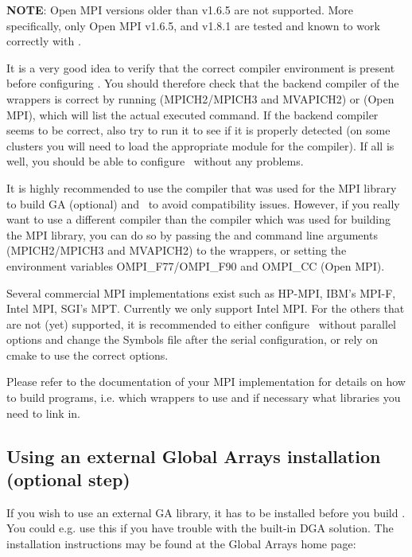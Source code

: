 \textbf{NOTE}: Open MPI versions older than v1.6.5 are not supported. More specifically,
only Open MPI v1.6.5, and v1.8.1 are tested and known to work correctly with \molcas.

It is a very good idea to verify that the correct compiler environment is
present before configuring \molcas.  You should therefore check that the
backend compiler of the wrappers is correct by running  (MPICH2/MPICH3 and MVAPICH2) or  (Open MPI),
which will list the actual executed command.  If the backend compiler seems to
be correct, also try to run it to see if it is properly detected (on some
clusters you will need to load the appropriate module for the compiler).  If all
is well, you should be able to configure \molcas\ without any problems.

It is highly recommended to use the compiler that was used for the MPI library
to build GA (optional) and \molcas\ to avoid compatibility issues.  However, if you really
want to use a different compiler than the compiler which was used for building
the MPI library, you can do so by passing the  and 
command line arguments (MPICH2/MPICH3 and MVAPICH2) to the wrappers, or setting the
environment variables OMPI\_F77/OMPI\_F90 and OMPI\_CC (Open MPI).

Several commercial MPI implementations exist such as HP-MPI, IBM's MPI-F, Intel
MPI, SGI's MPT.  Currently we only support Intel MPI. For the others that
are not (yet) supported, it is recommended to either configure \molcas\ without parallel
options and change the Symbols file after the serial configuration, or rely on
cmake to use the correct options.

Please refer to the documentation of your MPI implementation for details on how
to build programs, i.e. which wrappers to use and if necessary what libraries
you need to link in.



\subsection{Using an external Global Arrays installation (optional step)}

If you wish to use an external GA library, it has to be installed before
you build \molcas. You could e.g. use this if you have trouble with the built-in
DGA solution.
The installation instructions may be found at the Global Arrays home page:

